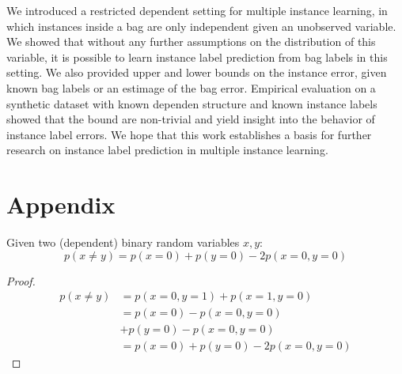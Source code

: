 We introduced a restricted dependent setting for multiple instance learning, in which instances inside a bag
are only independent given an unobserved variable. We showed that without any further assumptions
on the distribution of this variable, it is possible to learn instance label prediction from bag labels
in this setting. We also provided upper and lower bounds on the instance error, given known bag labels
or an estimage of the bag error.
Empirical evaluation on a synthetic dataset with known dependen structure and known instance labels
showed that the bound are non-trivial and yield insight into the behavior of instance label errors.
We hope that this work establishes a basis for further research on instance label prediction
in multiple instance learning.

\section{Appendix}
\begin{lemma}\label{binarylemma}
Given two (dependent) binary random variables $x,y$:
\begin{equation}
p(x \neq y) = p(x=0) + p(y=0) - 2 p(x=0, y=0)
\end{equation}

\begin{proof}
\begin{align}
p(x \neq y) & = p(x=0, y=1) + p(x=1, y=0) \\
                &= p(x=0) - p(x=0, y=0)\\
                &  + p(y=0) - p(x=0, y=0) \\
                &= p(x=0) + p(y=0) -2 p(x=0, y=0)
\end{align}
\end{proof}
\end{lemma}

